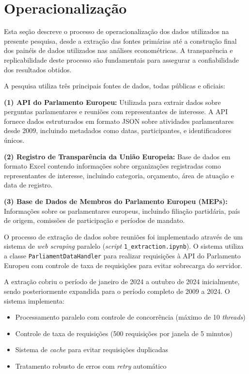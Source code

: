 \chapter{Operacionalização}

\label{appendix:operationalization}

Esta seção descreve o processo de operacionalização dos dados utilizados na presente pesquisa, desde a extração das fontes primárias até a construção final dos painéis de dados utilizados nas análises econométricas. A transparência e replicabilidade deste processo são fundamentais para assegurar a confiabilidade dos resultados obtidos.

A pesquisa utiliza três principais fontes de dados, todas públicas e oficiais:

\textbf{(1) API do Parlamento Europeu:} Utilizada para extrair dados sobre perguntas parlamentares e reuniões com representantes de interesse. A API fornece dados estruturados em formato JSON sobre atividades parlamentares desde 2009, incluindo metadados como datas, participantes, e identificadores únicos.

\textbf{(2) Registro de Transparência da União Europeia:} Base de dados em formato Excel contendo informações sobre organizações registradas como representantes de interesse, incluindo categoria, orçamento, área de atuação e data de registro.

\textbf{(3) Base de Dados de Membros do Parlamento Europeu (MEPs):} Informações sobre os parlamentares europeus, incluindo filiação partidária, país de origem, comissões de participação e períodos de mandato.


O processo de extração de dados sobre reuniões foi implementado através de um sistema de \textit{web scraping} paralelo (\textit{script} \texttt{1\_extraction.ipynb}). O sistema utiliza a classe \texttt{ParliamentDataHandler} para realizar requisições à API do Parlamento Europeu com controle de taxa de requisições para evitar sobrecarga do servidor.

A extração cobriu o período de janeiro de 2024 a outubro de 2024 inicialmente, sendo posteriormente expandida para o período completo de 2009 a 2024. O sistema implementa:
\begin{itemize}
    \item Processamento paralelo com controle de concorrência (máximo de 10 \textit{threads})
    \item Controle de taxa de requisições (500 requisições por janela de 5 minutos)
    \item Sistema de \textit{cache} para evitar requisições duplicadas
    \item Tratamento robusto de erros com \textit{retry} automático
\end{itemize}

